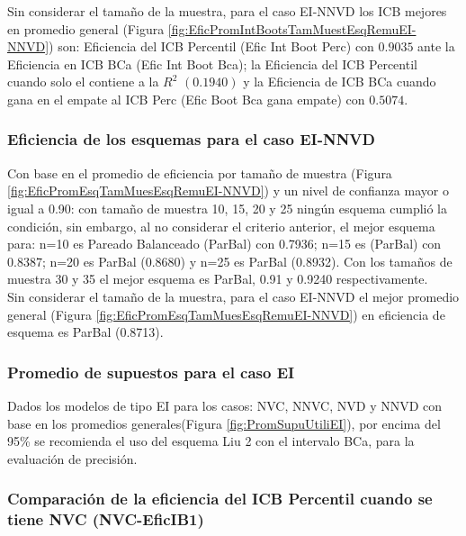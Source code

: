 Sin considerar el tamaño de la muestra, para el caso EI-NNVD los ICB mejores en promedio general (Figura \ref{fig:EficPromIntBootsTamMuestEsqRemuEI-NNVD}) son: Eficiencia del ICB Percentil (Efic Int Boot Perc) con $0.9035$ ante la Eficiencia en ICB BCa (Efic Int Boot Bca); la Eficiencia del ICB Percentil cuando solo el contiene a la $R^{2}$ $(0.1940)$ y la Eficiencia de ICB BCa cuando gana en el empate al ICB Perc (Efic Boot Bca gana empate) con $0.5074$.



\subsubsection{Eficiencia de los esquemas para el caso EI-NNVD}
Con base en el promedio de eficiencia por tamaño de muestra (Figura \ref{fig:EficPromEsqTamMuesEsqRemuEI-NNVD}) y un nivel de confianza mayor o igual a 0.90: con tamaño de muestra 10, 15, 20 y 25 ningún esquema cumplió la condición, sin embargo, al no considerar el criterio anterior, el mejor esquema para: n=10 es Pareado Balanceado (ParBal) con 0.7936; n=15 es (ParBal) con 0.8387;  n=20 es ParBal (0.8680) y  n=25 es ParBal (0.8932). Con los tamaños de muestra 30 y 35 el mejor esquema es ParBal, 0.91 y 0.9240 respectivamente.\\

Sin considerar el tamaño de la muestra, para el caso EI-NNVD el mejor promedio general (Figura \ref{fig:EficPromEsqTamMuesEsqRemuEI-NNVD}) en eficiencia de esquema es ParBal (0.8713).




\subsubsection{Promedio de supuestos para el caso EI}
Dados los modelos de tipo EI para los casos: NVC, NNVC, NVD y NNVD con base en los promedios generales(Figura \ref{fig:PromSupuUtiliEI}), por encima del 95\% se recomienda el uso del esquema Liu 2 con el intervalo BCa, para la evaluación de precisión.







\subsubsection{Comparación de la eficiencia del ICB Percentil cuando se tiene NVC (NVC-EficIB1)}

